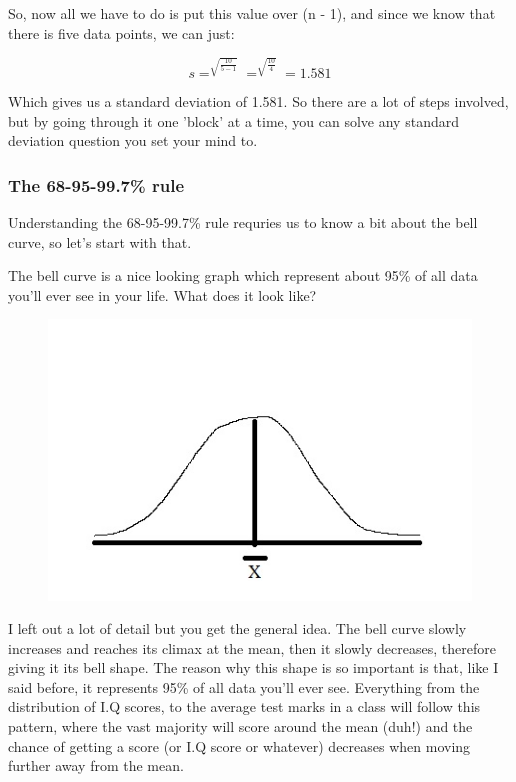 \documentclass[11pt]{article}
\begin{document}
So, now all we have to do is put this value over (n - 1), and since we know that there is five data points, we can just:

\begin{displaymath}
s = ^{\sqrt{\frac{10}{5-1}}} = ^{\sqrt{\frac{10}{4}}} = 1.581
\end{displaymath}

Which gives us a standard deviation of 1.581. So there are a lot of steps involved, but by going through it one 'block' at a time, you can solve any standard deviation question you set your mind to.

\subsubsection*{The 68-95-99.7\% rule}

Understanding the 68-95-99.7\% rule requries us to know a bit about the bell curve, so let's start with that. 

The bell curve is a nice looking graph which represent about 95\% of all data you'll ever see in your life. What does it look like?

\begin{figure}[htp]
\includegraphics[scale=1.00]{BellCurve1Image9.jpg}
\end{figure}

I left out a lot of detail but you get the general idea. The bell curve slowly increases and reaches its climax at the mean, then it slowly decreases, therefore giving it its bell shape. The reason why this shape is so important is that, like I said before, it represents 95\% of all data you'll ever see. Everything from the distribution of I.Q scores, to the average test marks in a class will follow this pattern, where the vast majority will score around the mean (duh!) and the chance of getting a score (or I.Q score or whatever) decreases when moving further away from the mean.
\end{document}
